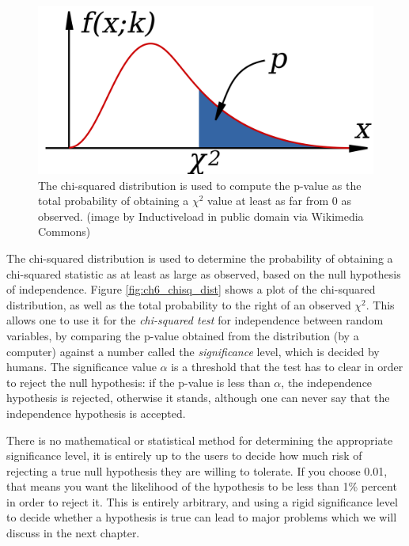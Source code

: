 \documentclass[
  letterpaper,
  DIV=11,
  numbers=noendperiod]{scrreprt}
\begin{document}
\begin{figure}

{\centering \includegraphics{./ch6/Chi-Squared_Distribution.png}

}

\caption{The chi-squared distribution is used to compute the p-value as
the total probability of obtaining a \(\chi^2\) value at least as far
from 0 as observed. (image by Inductiveload in public domain via
Wikimedia Commons)}

\end{figure}

The chi-squared distribution is used to determine the probability of
obtaining a chi-squared statistic as at least as large as observed,
based on the null hypothesis of independence. Figure
\ref{fig:ch6_chisq_dist} shows a plot of the chi-squared distribution,
as well as the total probability to the right of an observed \(\chi^2\).
This allows one to use it for the \emph{chi-squared test} for
independence between random variables, by comparing the p-value obtained
from the distribution (by a computer) against a number called the
\emph{significance} level, which is decided by humans. The significance
value \(\alpha\) is a threshold that the test has to clear in order to
reject the null hypothesis: if the p-value is less than \(\alpha\), the
independence hypothesis is rejected, otherwise it stands, although one
can never say that the independence hypothesis is accepted.

There is no mathematical or statistical method for determining the
appropriate significance level, it is entirely up to the users to decide
how much risk of rejecting a true null hypothesis they are willing to
tolerate. If you choose 0.01, that means you want the likelihood of the
hypothesis to be less than 1\% percent in order to reject it. This is
entirely arbitrary, and using a rigid significance level to decide
whether a hypothesis is true can lead to major problems which we will
discuss in the next chapter.
\end{document}
